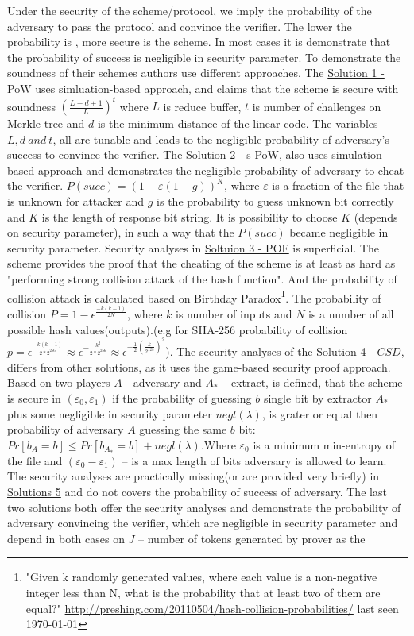 \documentclass[12pt]{article}
\begin{document}
\noindent Under the security of the scheme/protocol, we imply the probability of the adversary to pass the protocol and convince the verifier. The lower the probability is , more secure is the scheme. In most cases it is demonstrate that the probability of success is negligible in security parameter. To demonstrate the soundness of their schemes authors use different approaches. The \hyperref[sub:Soltuion1] {Solution 1 - PoW} uses simluation-based approach, and claims that the scheme is secure with soundness  $\left( \frac{L-d+1}{L}\right)^t$ where $L$ is reduce buffer, $t$ is number of challenges on Merkle-tree and $d$ is the minimum distance of the linear code. The variables $L,d\ and\ t$, all are tunable and leads to the negligible probability of adversary's success to convince the verifier. The \hyperref[sub:Soltuion2] {Solution 2 - s-PoW}, also uses  simulation-based approach and demonstrates the negligible probability of adversary to cheat the verifier. $P(succ) = (1-\varepsilon(1-g))^K$, where $\varepsilon$ is a fraction of the file that is unknown for attacker and $g$ is the probability to guess unknown bit correctly and $K$ is the length of response bit string. It is possibility to choose $K$ (depends on security parameter), in such a way that the $P(succ)$ became negligible in security parameter. Security analyses in \hyperref[sub:Soltuion3]{Soltuion 3 - POF} is superficial. The scheme  provides the proof that the cheating of the scheme is at least as hard as "performing strong collision attack of the hash function". And the probability of collision attack is calculated based on Birthday Paradox\footnote{"Given k randomly generated values, where each value is a non-negative integer less than N, what is the probability that at least two of them are equal?" \url{http://preshing.com/20110504/hash-collision-probabilities/} last seen \today}. The probability of collision $P=1- \epsilon^{\frac{-k(k-1)}{2N}}$, where $k$ is number of inputs and $N$ is a number of all possible hash values(outputs).(e.g for SHA-256 probability of collision $p=\epsilon^{\frac{-k(k-1)}{2* 2^{256}}}\approx\epsilon^{-\frac{k^2}{2* 2^{256}}}\approx\epsilon^{-\frac{1}{2}( \frac{k}{2^{128}})^2}$). The security analyses of the   \hyperref[sub:Soltuion4]{Solution 4 - $CSD$}, differs from other solutions, as it uses the game-based security proof approach. Based on  two players $A$ - adversary and $A_*$ -- extract, is defined, that the scheme is secure in $(\varepsilon_0, \varepsilon_1)$ if the probability of guessing $b$ single bit by extractor $A_*$ plus some negligible in security parameter $negl(\lambda)$, is grater or equal then probability of adversary $A$ guessing the same $b$ bit: $Pr[b_A=b]\leq Pr[b_{A_*}=b]+negl(\lambda)$.Where $\varepsilon_0$ is a minimum min-entropy of the file and $(\varepsilon_0 - \varepsilon_1 )$ – is a max length of bits adversary is allowed to learn. The security analyses are practically missing(or are provided very briefly) in  \hyperref[sub:Soltuion5]{Solutions 5} and do not covers the probability of success of adversary. The last two solutions both offer the security analyses and demonstrate the probability of adversary convincing the verifier, which are negligible in security parameter and depend in both cases on $J$ -- number of tokens generated by prover as the 
\end{document}
